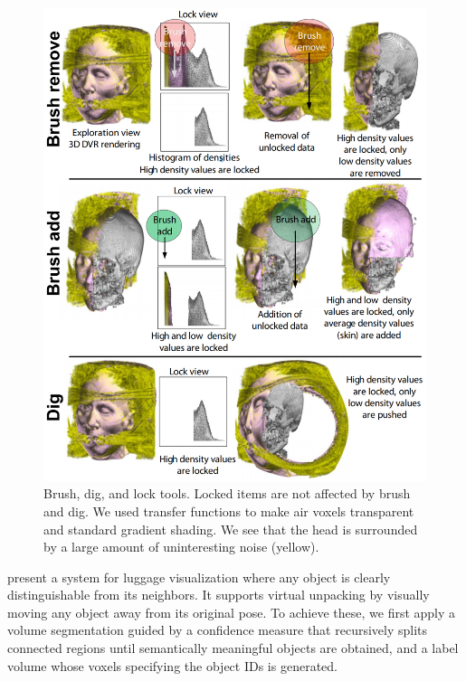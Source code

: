 \begin{figure}
\centering
\includegraphics[width=\textwidth]{Figures/colortunneling}
\decoRule
\caption[ Color Tunneling]{ Brush, dig, and lock tools. Locked items are not affected by
brush and dig. We used transfer functions to make air voxels transparent
and standard gradient shading. We see that the head is surrounded by a
large amount of uninteresting noise (yellow).}
\label{fig:colortunneling}
\end{figure}



\cite{Li:2012:LVV:2425296.2425325} present a system for luggage visualization where any object is
clearly distinguishable from its neighbors. It supports virtual unpacking
by visually moving any object away from its original pose. To achieve these, we first apply a volume segmentation guided by
a confidence measure that recursively splits connected regions until
semantically meaningful objects are obtained, and a label volume
whose voxels specifying the object IDs is generated. 


